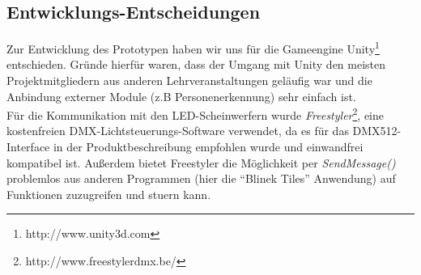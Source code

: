 \subsection{Entwicklungs-Entscheidungen}\label{sec:entscheidungen}

Zur Entwicklung des Prototypen haben wir uns für die Gameengine Unity\footnote{http://www.unity3d.com} entschieden.
Gründe hierfür waren, dass der Umgang mit Unity den meisten Projektmitgliedern aus anderen Lehrveranstaltungen geläufig war und die Anbindung externer Module (z.B Personenerkennung) sehr einfach ist.\\
Für die Kommunikation mit den LED-Scheinwerfern wurde \emph{Freestyler}\footnote{http://www.freestylerdmx.be/}, eine kostenfreien DMX-Lichtsteuerungs-Software verwendet, da es für das DMX512-Interface in der Produktbeschreibung empfohlen wurde und einwandfrei kompatibel ist. Außerdem bietet Freestyler die Möglichkeit per \emph{SendMessage()} problemlos aus anderen Programmen (hier die "`Blinek Tiles"' Anwendung) auf Funktionen zuzugreifen und stuern kann.